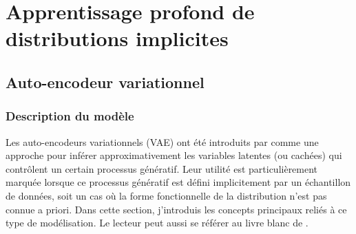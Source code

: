 \chapter{Apprentissage profond de distributions implicites}\label{chap:intro ml 2}

\section{Auto-encodeur variationnel}\label{sec:vae}
 
\subsection{Description du modèle}

Les auto-encodeurs variationnels (VAE) ont été introduits par \citet{Kingma2013} comme une approche 
pour inférer approximativement les variables latentes (ou cachées) qui contrôlent un certain processus génératif. 
Leur utilité est particulièrement marquée lorsque ce processus génératif est défini implicitement par un échantillon de données, 
soit un cas où la forme fonctionnelle de la distribution n'est pas connue a priori.
Dans cette section, j'introduis 
les concepts principaux reliés à ce type de modélisation. 
Le lecteur peut aussi se référer au livre blanc de \citet{Kingma2019}.


